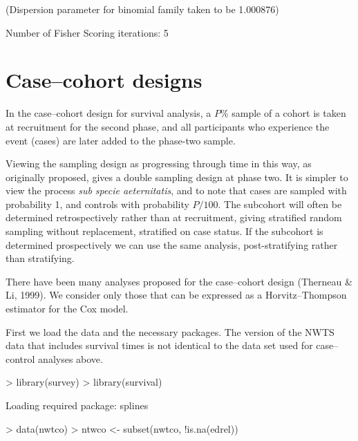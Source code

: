 \documentclass{article}
\begin{document}
\begin{Schunk}
\begin{Soutput}
(Dispersion parameter for binomial family taken to be 1.000876)

Number of Fisher Scoring iterations: 5
\end{Soutput}
\end{Schunk}


\section*{Case--cohort designs}
In the case--cohort design for survival analysis, a $P$\% sample of a cohort
is taken at recruitment for the second phase, and all participants who
experience the event (cases) are later added to the phase-two sample.

Viewing the sampling design as progressing through time in this way,
as originally proposed, gives a double sampling design at phase two.
It is simpler to view the process \emph{sub specie aeternitatis}, and
to note that cases are sampled with probability 1, and controls with
probability $P/100$. The subcohort will often be determined
retrospectively rather than at recruitment, giving stratified random
sampling without replacement, stratified on case status.  If the
subcohort is determined prospectively we can use the same analysis,
post-stratifying rather than stratifying.

There have been many analyses proposed for the case--cohort design
(Therneau \& Li, 1999).  We consider only those that can be expressed as a
Horvitz--Thompson estimator for the Cox model.



First we load the data and the necessary packages. The version of the
NWTS data that includes survival times is not identical to the data
set used for case--control analyses above.
\begin{Schunk}
\begin{Sinput}
> library(survey)
> library(survival)
\end{Sinput}
\begin{Soutput}
Loading required package: splines
\end{Soutput}
\begin{Sinput}
> data(nwtco)
> ntwco <- subset(nwtco, !is.na(edrel))
\end{Sinput}
\end{Schunk}
\end{document}
